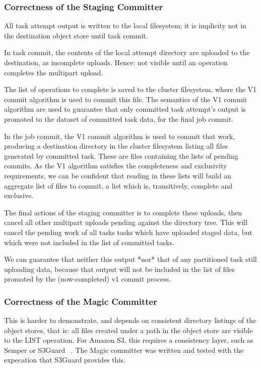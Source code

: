 \documentclass[conference]{IEEEtran}
\begin{document}
\subsubsection{Correctness of the Staging Committer}

All task attempt output is written to the local filesystem;
it is implicity not in the destination object store until task commit.

In task commit, the contents of the local attempt directory are uploaded to the
destination, as incomplete uploads.
Hence: not visible until an operation completes the multipart upload.

The list of operations to complete is saved to the cluster filesystem, where
the V1 commit algorithm is used to commit this file.
The semantics of the V1 commit algorithm are used to guarantee that only
committed task attempt's output is promoted to the dataset of committed task
data, for the final job commit.

In the job commit, the V1 commit algorithm is used to commit that work, producing
a destination directory in the cluster filesystem listing all files generated
by committed task.
These are files containing the lists of pending commits.
As the V1 algorithm satisfies the completeness and exclusivity requirements,
we can be confident that reading in these lists will build an aggregate list
of files to commit, a list which is, transitively, complete and exclusive.

The final actions of the staging committer is to complete these uploads,
then cancel all other multipart uploads pending against the directory tree.
This will cancel the pending work of all tasks tasks which have uploaded staged
data, but which were not included in the list of committed tasks.

We can guarantee that neither this output *nor* that of any partitioned
task still uploading data, because that output will not be included in the
list of files promoted by the (now-completed) v1 commit process.

\subsubsection{Correctness of the Magic Committer}

This is harder to demonstrate, and depends on consistent directory
listings of the object stores, that is: all files created under a path
in the object store are visible to the LIST operation.
For Amazon S3, this requires a consistency layer, such as Semper or S3Guard
\ \cite{Semper,HADOOP-13345}.
The Magic committer was written and tested with the expecation that S3Guard
provides this.
\end{document}

